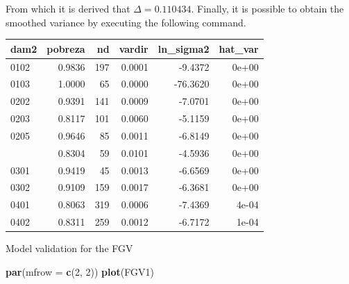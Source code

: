\documentclass[
  12pt,
]{book}
\newenvironment{Shaded}{\begin{snugshade}}{\end{snugshade}}
\newcommand{\AttributeTok}[1]{\textcolor[rgb]{0.13,0.29,0.53}{#1}}
\newcommand{\DecValTok}[1]{\textcolor[rgb]{0.00,0.00,0.81}{#1}}
\newcommand{\FunctionTok}[1]{\textcolor[rgb]{0.13,0.29,0.53}{\textbf{#1}}}
\newcommand{\NormalTok}[1]{#1}
\newcommand{\OtherTok}[1]{\textcolor[rgb]{0.56,0.35,0.01}{#1}}
\newcommand{\SpecialCharTok}[1]{\textcolor[rgb]{0.81,0.36,0.00}{\textbf{#1}}}
\begin{document}
From which it is derived that \(\Delta = 0.110434\). Finally, it is possible to obtain the smoothed variance by executing the following command.

\begin{Shaded}
\end{Shaded}

\begin{table}[H]
\centering
\centering
\begin{tabular}[t]{lrrrrr}
\toprule
dam2 & pobreza & nd & vardir & ln\_sigma2 & hat\_var\\
\midrule
0102 & 0.9836 & 197 & 0.0001 & -9.4372 & 0e+00\\
0103 & 1.0000 & 65 & 0.0000 & -76.3620 & 0e+00\\
0202 & 0.9391 & 141 & 0.0009 & -7.0701 & 0e+00\\
0203 & 0.8117 & 101 & 0.0060 & -5.1159 & 0e+00\\
0205 & 0.9646 & 85 & 0.0011 & -6.8149 & 0e+00\\
\addlinespace
0212 & 0.8304 & 59 & 0.0101 & -4.5936 & 0e+00\\
0301 & 0.9419 & 45 & 0.0013 & -6.6569 & 0e+00\\
0302 & 0.9109 & 159 & 0.0017 & -6.3681 & 0e+00\\
0401 & 0.8063 & 319 & 0.0006 & -7.4369 & 4e-04\\
0402 & 0.8311 & 259 & 0.0012 & -6.7172 & 1e-04\\
\bottomrule
\end{tabular}
\end{table}

Model validation for the FGV

\begin{Shaded}
\begin{Highlighting}[]
\FunctionTok{par}\NormalTok{(}\AttributeTok{mfrow =} \FunctionTok{c}\NormalTok{(}\DecValTok{2}\NormalTok{, }\DecValTok{2}\NormalTok{))}
\FunctionTok{plot}\NormalTok{(FGV1)}
\end{Highlighting}
\end{Shaded}
\end{document}
